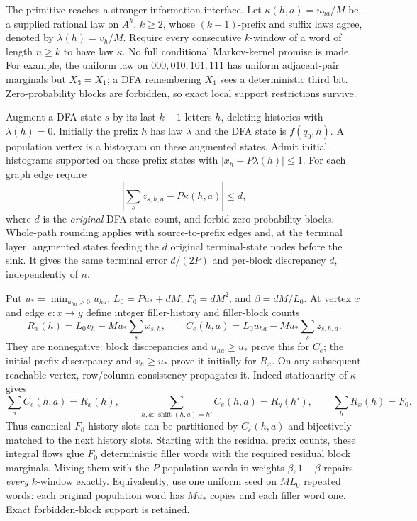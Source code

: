 \documentclass[11pt]{article}
\begin{document}
The primitive reaches a stronger information interface. Let $\kappa(h,a)=u_{ha}/M$ be a supplied rational law on $A^k$, $k\ge2$, whose $(k-1)$-prefix and suffix laws agree, denoted by $\lambda(h)=v_h/M$. Require every consecutive $k$-window of a word of length $n\ge k$ to have law $\kappa$. No full conditional Markov-kernel promise is made. For example, the uniform law on $000,010,101,111$ has uniform adjacent-pair marginals but $X_3=X_1$; a DFA remembering $X_1$ sees a deterministic third bit. Zero-probability blocks are forbidden, so exact local support restrictions survive.

Augment a DFA state $s$ by its last $k-1$ letters $h$, deleting histories with $\lambda(h)=0$. Initially the prefix $h$ has law $\lambda$ and the DFA state is $f(q_0,h)$. A population vertex is a histogram on these augmented states. Admit initial histograms supported on those prefix states with $|x_h-P\lambda(h)|\le1$. For each graph edge require
\[
\left|\sum_s z_{s,h,a}-P\kappa(h,a)\right|\le d,
\]
where $d$ is the \emph{original} DFA state count, and forbid zero-probability blocks. Whole-path rounding applies with source-to-prefix edges and, at the terminal layer, augmented states feeding the $d$ original terminal-state nodes before the sink. It gives the same terminal error $d/(2P)$ and per-block discrepancy $d$, independently of $n$.

Put $u_* =\min_{u_{ha}>0}u_{ha}$, $L_0=Pu_*+dM$, $F_0=dM^2$, and $\beta=dM/L_0$. At vertex $x$ and edge $e:x\to y$ define integer filler-history and filler-block counts
\[
R_x(h)=L_0v_h-Mu_*\sum_sx_{s,h},\qquad
C_e(h,a)=L_0u_{ha}-Mu_*\sum_s z_{s,h,a}.
\tag{C8}
\]
They are nonnegative: block discrepancies and $u_{ha}\ge u_*$ prove this for $C_e$; the initial prefix discrepancy and $v_h\ge u_*$ prove it initially for $R_x$. On any subsequent reachable vertex, row/column consistency propagates it. Indeed stationarity of $\kappa$ gives
\[
\sum_a C_e(h,a)=R_x(h),\qquad
\sum_{h,a:\,\operatorname{shift}(h,a)=h'}C_e(h,a)=R_y(h'),\qquad
\sum_h R_x(h)=F_0.
\tag{C9}
\]
Thus canonical $F_0$ history slots can be partitioned by $C_e(h,a)$ and bijectively matched to the next history slots. Starting with the residual prefix counts, these integral flows glue $F_0$ deterministic filler words with the required residual block marginals. Mixing them with the $P$ population words in weights $\beta,1-\beta$ repairs \emph{every} $k$-window exactly. Equivalently, use one uniform seed on $M L_0$ repeated words: each original population word has $Mu_*$ copies and each filler word one. Exact forbidden-block support is retained.
\end{document}
